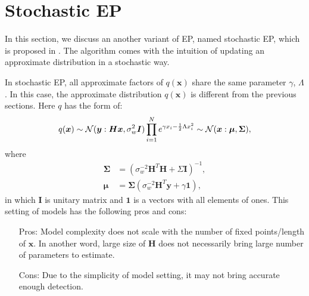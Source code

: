 \documentclass{article}
\begin{document}
\section{Stochastic EP}\label{sec:stochasticEP}
In this section, we discuss an another variant of EP, named stochastic EP, which is proposed in \cite{yingzhen2015stochastic_ep}. The algorithm comes with the intuition of updating an approximate distribution in a stochastic way.

In stochastic EP, all approximate factors of $q(\bm{x})$ share the same parameter $\gamma$, $\Lambda$. In this case, the approximate distribution $q(\bm{x})$ is different from the previous sections. Here $q$ has the form of:
\begin{equation}
  q(\bm{x}) \sim \mathcal{N}(\bm{y}: \bm{H}\bm{x}, \sigma_w^2 \bm{I}) \prod_{i=1}^{N} e^{\gamma x_i - \frac{1}{2}\Lambda x_i^2} \sim \mathcal{N}(\bm{x}: \bm{\mu}, \bm{\Sigma}),
\end{equation}
where
\begin{align}
  \bm{\Sigma} &= (\sigma_w^{-2}\bm{H}^T\bm{H} + \Sigma \bm{I})^{-1},\\
  \bm{\mu} & = \bm{\Sigma} ( \sigma_w^{-2}\bm{H}^T\bm{y} + \gamma \bm{1}),
\end{align}
in which $\bm{I}$ is unitary matrix and $\bm{1}$ is a vectors with all elements of ones. This setting of models has the following pros and cons:
\begin{itemize}
\item[Pros:] Model complexity does not scale with the number of fixed points/length of $\bm{x}$. In another word, large size of $\bm{H}$ does not necessarily bring large number of parameters to estimate.
\item[Cons:] Due to the simplicity of model setting, it may not bring accurate enough detection.
\end{itemize}
\end{document}
